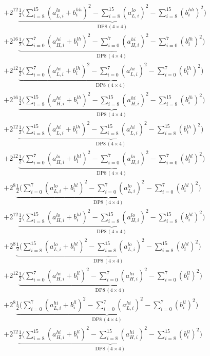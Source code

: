 \documentclass[fleqn]{article}
\newcommand{\DPop}[3]{\mathrm{DP#1}\,(#2\!\times\!#3)}
\begin{document}
\begin{align*}
  & + 2^{12}\underbrace{\tfrac{1}{2}\Big(\sum_{i=8}^{15}(a_{L,i}^{lo}{+}b_i^{hh})^2 - \sum_{i=8}^{15}(a_{L,i}^{lo})^2 - \sum_{i=8}^{15}(b_i^{hh})^2\Big)}_{\DPop{8}{4}{4}} \\[0.3em]
  & + 2^{16}\underbrace{\tfrac{1}{2}\Big(\sum_{i=0}^{7}(a_{H,i}^{hi}{+}b_i^{lh})^2 - \sum_{i=0}^{7}(a_{H,i}^{hi})^2 - \sum_{i=0}^{7}(b_i^{lh})^2\Big)}_{\DPop{8}{4}{4}} \\[0.3em]
  & + 2^{12}\underbrace{\tfrac{1}{2}\Big(\sum_{i=0}^{7}(a_{L,i}^{hi}{+}b_i^{lh})^2 - \sum_{i=0}^{7}(a_{L,i}^{hi})^2 - \sum_{i=0}^{7}(b_i^{lh})^2\Big)}_{\DPop{8}{4}{4}} \\[0.3em]
  & + 2^{16}\underbrace{\tfrac{1}{2}\Big(\sum_{i=8}^{15}(a_{H,i}^{hi}{+}b_i^{lh})^2 - \sum_{i=8}^{15}(a_{H,i}^{hi})^2 - \sum_{i=8}^{15}(b_i^{lh})^2\Big)}_{\DPop{8}{4}{4}} \\[0.3em]
  & + 2^{12}\underbrace{\tfrac{1}{2}\Big(\sum_{i=8}^{15}(a_{L,i}^{hi}{+}b_i^{lh})^2 - \sum_{i=8}^{15}(a_{L,i}^{hi})^2 - \sum_{i=8}^{15}(b_i^{lh})^2\Big)}_{\DPop{8}{4}{4}} \\[0.3em]
  & + 2^{12}\underbrace{\tfrac{1}{2}\Big(\sum_{i=0}^{7}(a_{H,i}^{lo}{+}b_i^{hl})^2 - \sum_{i=0}^{7}(a_{H,i}^{lo})^2 - \sum_{i=0}^{7}(b_i^{hl})^2\Big)}_{\DPop{8}{4}{4}} \\[0.3em]
  & + 2^{8}\underbrace{\tfrac{1}{2}\Big(\sum_{i=0}^{7}(a_{L,i}^{lo}{+}b_i^{hl})^2 - \sum_{i=0}^{7}(a_{L,i}^{lo})^2 - \sum_{i=0}^{7}(b_i^{hl})^2\Big)}_{\DPop{8}{4}{4}} \\[0.3em]
  & + 2^{12}\underbrace{\tfrac{1}{2}\Big(\sum_{i=8}^{15}(a_{H,i}^{lo}{+}b_i^{hl})^2 - \sum_{i=8}^{15}(a_{H,i}^{lo})^2 - \sum_{i=8}^{15}(b_i^{hl})^2\Big)}_{\DPop{8}{4}{4}} \\[0.3em]
  & + 2^{8}\underbrace{\tfrac{1}{2}\Big(\sum_{i=8}^{15}(a_{L,i}^{lo}{+}b_i^{hl})^2 - \sum_{i=8}^{15}(a_{L,i}^{lo})^2 - \sum_{i=8}^{15}(b_i^{hl})^2\Big)}_{\DPop{8}{4}{4}} \\[0.3em]
  & + 2^{12}\underbrace{\tfrac{1}{2}\Big(\sum_{i=0}^{7}(a_{H,i}^{hi}{+}b_i^{ll})^2 - \sum_{i=0}^{7}(a_{H,i}^{hi})^2 - \sum_{i=0}^{7}(b_i^{ll})^2\Big)}_{\DPop{8}{4}{4}} \\[0.3em]
  & + 2^{8}\underbrace{\tfrac{1}{2}\Big(\sum_{i=0}^{7}(a_{L,i}^{hi}{+}b_i^{ll})^2 - \sum_{i=0}^{7}(a_{L,i}^{hi})^2 - \sum_{i=0}^{7}(b_i^{ll})^2\Big)}_{\DPop{8}{4}{4}} \\[0.3em]
  & + 2^{12}\underbrace{\tfrac{1}{2}\Big(\sum_{i=8}^{15}(a_{H,i}^{hi}{+}b_i^{ll})^2 - \sum_{i=8}^{15}(a_{H,i}^{hi})^2 - \sum_{i=8}^{15}(b_i^{ll})^2\Big)}_{\DPop{8}{4}{4}} \\[0.3em]

\end{align*}
\end{document}
